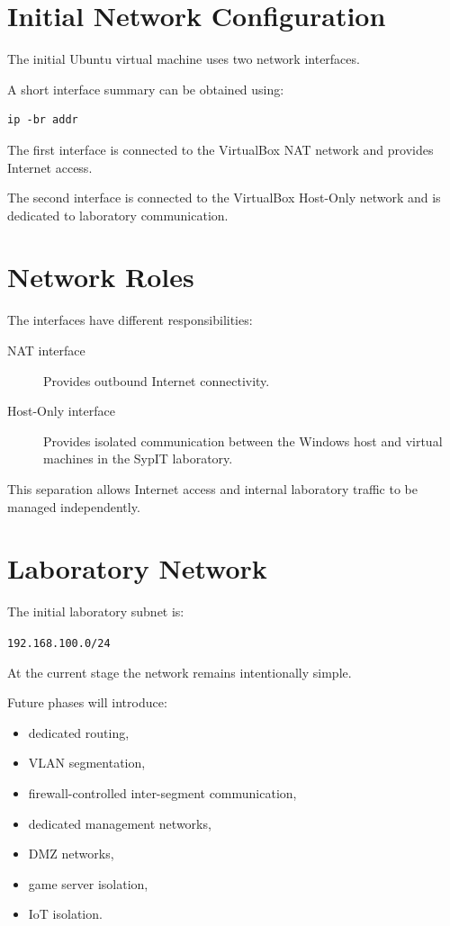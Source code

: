 \section{Initial Network Configuration}

The initial Ubuntu virtual machine uses two network interfaces.

A short interface summary can be obtained using:

\begin{lstlisting}[style=terminal]
ip -br addr
\end{lstlisting}

The first interface is connected to the VirtualBox NAT network and provides
Internet access.

The second interface is connected to the VirtualBox Host-Only network and
is dedicated to laboratory communication.

\section{Network Roles}

The interfaces have different responsibilities:

\begin{description}
    \item[NAT interface] Provides outbound Internet connectivity.
    \item[Host-Only interface] Provides isolated communication between
    the Windows host and virtual machines in the SypIT laboratory.
\end{description}

This separation allows Internet access and internal laboratory traffic
to be managed independently.

\section{Laboratory Network}

The initial laboratory subnet is:

\begin{center}
\texttt{192.168.100.0/24}
\end{center}

At the current stage the network remains intentionally simple.

Future phases will introduce:

\begin{itemize}
    \item dedicated routing,
    \item VLAN segmentation,
    \item firewall-controlled inter-segment communication,
    \item dedicated management networks,
    \item DMZ networks,
    \item game server isolation,
    \item IoT isolation.
\end{itemize}